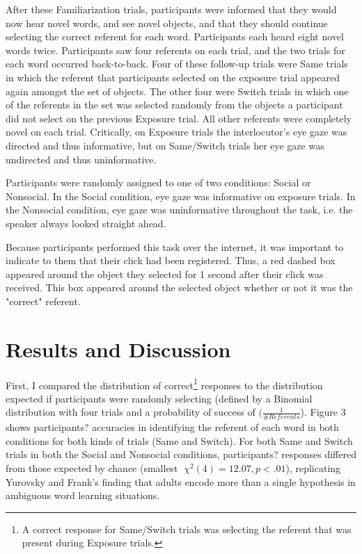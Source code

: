\documentclass[10pt,letterpaper]{article}
\begin{document}
After these Familiarization trials, participants were informed that they would now hear
novel words, and see novel objects, and that they should continue selecting the correct
referent for each word. Participants each heard eight novel words twice. Participants saw four referents
on each trial, and the two trials for each word occurred back-to-back. Four of these
follow-up trials were Same trials in which the referent that participants selected on the exposure trial appeared again amongst the set of objects. The other four were
Switch trials in which one of the referents in the set was selected randomly from the objects
a participant did not select on the previous Exposure trial. All other referents were
completely novel on each trial. Critically, on Exposure trials the interlocutor's eye gaze was directed and thus informative, but on Same/Switch trials her eye gaze was undirected and thus uninformative. 

Participants were randomly assigned to one of two conditions: Social or Nonsocial. In the Social condition, eye gaze was informative on exposure trials. In the Nonsocial condition, eye gaze was uninformative throughout the task, i.e. the speaker always looked straight ahead. 

Because participants performed this task over the internet, it was important to
indicate to them that their click had been registered. Thus, a red dashed box appeared
around the object they selected for 1 second after their click was received. This box
appeared around the selected object whether or not it was the "correct" referent.

\section{Results and Discussion}

First, I compared the distribution of correct\footnote{A correct response for Same/Switch trials was selecting the referent that was present during Exposure trials.} responses to the distribution expected if participants were randomly selecting (defined by a Binomial distribution with four trials and a probability of success of $(\frac{1}{\#Referents}$). Figure 3 shows participants? accuracies in identifying the referent of each word in both conditions for both kinds of trials (Same and Switch). For both Same and Switch trials in both the Social and Nonsocial conditions, participants? responses differed from those expected by chance (smallest $\chi^{2}(4) = 12.07, p < .01$), replicating Yurovsky and Frank's finding that adults encode more than a single hypothesis in ambiguous word learning situations. 
\end{document}
